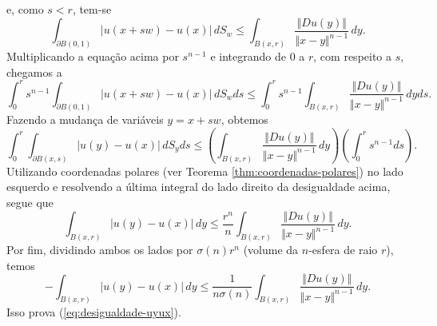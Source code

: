 \documentclass[a4paper, 11pt]{book}
\theoremstyle{definition}
\newcommand{\sint}{-\!\!\!\!\!\!\int}
\begin{document}
\begin{prf}
\[    \]
    e, como $s < r$, tem-se
    \[
        \int_{\partial B(0,1)} |u(x + sw) - u(x)|\,dS_w \leqslant   \int_{B(x,r)} \frac{\Vert Du(y) \Vert}{\Vert x - y \Vert^{n-1}} \,dy.
    \]
    Multiplicando a equação acima por $s^{n-1}$ e integrando de $0$ a $r$, com respeito a $s$, chegamos a
    \[
        \int_0^r s^{n-1} \int_{\partial B(0,1)} |u(x + sw) - u(x)| \,dS_wds \leqslant \int_0^r s^{n-1} \int_{B(x,r)} \frac{\Vert Du(y) \Vert}{\Vert x - y \Vert^{n-1}} \,dyds.
    \]
    Fazendo a mudança de variáveis $y = x + sw$, obtemos
    \[
        \int_0^r \int_{\partial B(x,s)} |u(y) - u(x)|\, dS_yds \leqslant \left( \int_{B(x,r)} \frac{\Vert Du(y) \Vert}{\Vert x - y \Vert^{n-1}} \,dy \right) \left( \int_0^r s^{n-1} ds \right).
    \]
    Utilizando coordenadas polares (ver Teorema \ref{thm:coordenadas-polares}) no lado esquerdo e resolvendo a última integral do lado direito da desigualdade acima, segue que
    \[
        \int_{B(x,r)} |u(y) - u(x)|\,dy \leqslant \frac{r^n}{n} \int_{B(x,r)} \frac{\Vert Du(y) \Vert}{\Vert x - y \Vert^{n-1}} \,dy.
    \]
    Por fim, dividindo ambos os lados por $\sigma(n) r^n$ (volume da $n$-esfera de raio $r$), temos
    \[
        \sint_{B(x,r)} |u(y) - u(x)| \,dy \leqslant \frac{1}{n\sigma(n)} \int_{B(x,r)} \frac{\Vert Du(y) \Vert}{\Vert x-y \Vert^{n-1}} \,dy.
    \]
    Isso prova (\ref{eq:desigualdade-uyux}).


\end{prf}
\end{document}
